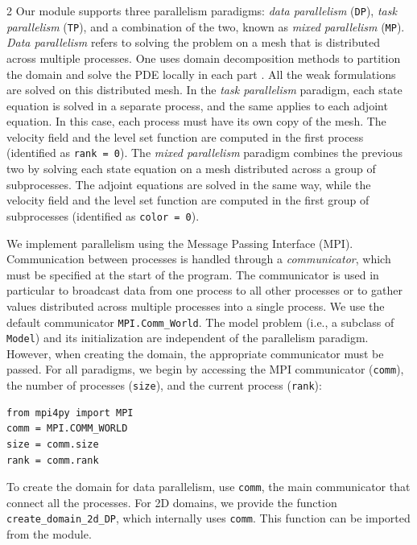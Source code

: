 \documentclass[a4paper, oneside]{article}
\newcommand{\code}[1]{\texttt{#1}}
\begin{document}
\begin{multicols}{2}
Our module supports three parallelism paradigms:
\textit{data parallelism} (\code{DP}),
\textit{task parallelism} (\code{TP}), and a combination of the two,
known as \textit{mixed parallelism} (\code{MP}).
\textit{Data parallelism} refers to solving the problem on a mesh
that is distributed across multiple processes.
One uses domain decomposition methods to partition the domain and solve the PDE locally in each part \cite{MR2104179}. 
All the weak formulations are solved on this distributed mesh.
In the \textit{task parallelism} paradigm, each state equation is solved
in a separate process, and the same applies to each adjoint equation.
In this case, each process must have its own copy of the mesh.
The velocity field and the level set function are computed
in the first process (identified as \code{rank = 0}).
The \textit{mixed parallelism} paradigm combines the previous two by
solving each state equation on a mesh distributed across a group
of subprocesses. The adjoint equations are solved in the same 
way, while the velocity field and the level set function are computed
in the first group of subprocesses (identified as \code{color = 0}).

We implement parallelism using the Message Passing Interface (MPI). 
Communication between processes is handled through a {\it communicator}, which must be specified at the start of the program. The communicator is used in particular to broadcast data from one process to all other processes or to gather values distributed across multiple processes into a single process.
We use the default communicator \texttt{MPI.Comm\_World}.
The model problem (i.e., a subclass of \code{Model})
and its initialization are independent of the parallelism paradigm.
However, when creating the domain, the appropriate communicator must be passed.
For all paradigms, we begin by accessing the MPI communicator (\code{comm}),
the number of processes (\code{size}), and the current process (\code{rank}):
\begin{lstlisting}
from mpi4py import MPI
comm = MPI.COMM_WORLD
size = comm.size
rank = comm.rank
\end{lstlisting}

To create the domain for data parallelism, use \code{comm},
the main communicator that connect all the processes.
For 2D domains, we provide the function
\code{create\_domain\_2d\_DP}, which internally uses \code{comm}.
This function can be imported from the module.


\end{multicols}
\end{document}
